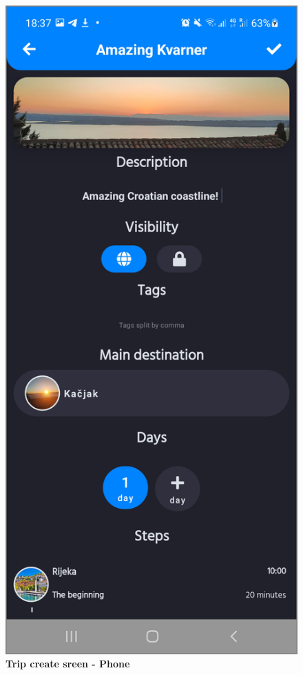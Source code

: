 \begin{figure}[!htb]
\begin{minipage}{.45\textwidth}
\includegraphics[width=.8\textwidth]{../Images/UI/TripCreateDark.jpg}
\caption{\label{fig:dbapiuser}\textbf{Trip create sreen - Phone}}
\end{minipage}
\end{figure} 

\newpage